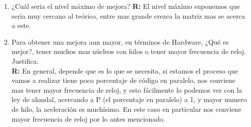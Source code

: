 \documentclass[12pt]{extarticle} %
\begin{document}
\begin{enumerate}
\begin{enumerate}
        \item ¿Cuál seria el nivel máximo de mejora?
        \textbf{R: } El nivel máximo suponemos que seria muy cercano al teórico, entre mas grande crezca la matriz mas se acerca a este.
        \newpage
        \item Para obtener una mejora aun mayor, en términos de Hardware, ¿Qué es mejor?, tener muchos mas núcleos con hilos o tener mayor frecuencia de reloj. Justifica. \\ 
        \textbf{R: } En general, depende que es lo que se necesita, si estamos el proceso que vamos a realizar tiene poco porcentaje de código en paralelo, nos conviene mas tener mayor frecuencia de reloj, y esto fácilmente lo podemos ver con la ley de ahmdal, acercando a P (el porcentaje en paralelo) a 1, y mayor numero de hilo, la aceleración es muchísimo.
        En este caso en particular nos conviene mayor frecuencia de reloj por lo antes mencionado.
        
    \end{enumerate}
    

\end{enumerate}
\end{document}
